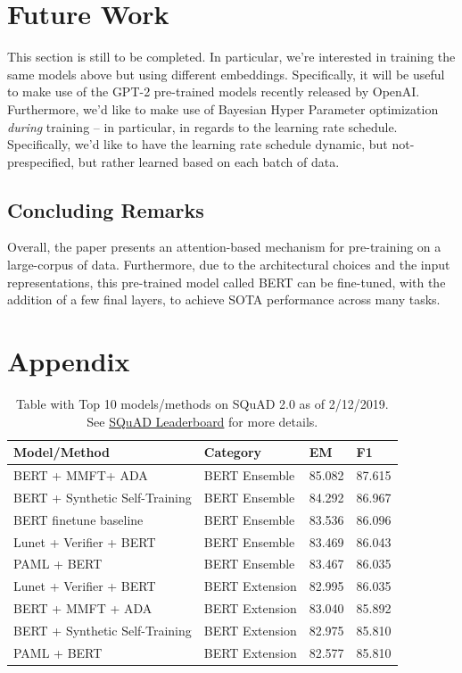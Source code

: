 \documentclass{article}
\begin{document}
\section{Future Work}
This section is still to be completed. In particular, we're interested in training the same models above but using different embeddings. Specifically, it will be useful to make use of the GPT-2 pre-trained models recently released by OpenAI. Furthermore, we'd like to make use of Bayesian Hyper Parameter optimization \textit{during} training -- in particular, in regards to the learning rate schedule. Specifically, we'd like to have the learning rate schedule dynamic, but not-prespecified, but rather learned based on each batch of data.

\subsection{Concluding Remarks}
Overall, the paper presents an attention-based mechanism for pre-training on a large-corpus of data. Furthermore, due to the architectural choices and the input representations, this pre-trained model called BERT can be fine-tuned, with the addition of a few final layers, to achieve SOTA performance across many tasks. 


\section{Appendix}

\begin{table}[!ht]
\centering
\begin{tabular}{l|l|l|l}
Model/Method                   & Category       & EM     & F1     \\ \hline
BERT + MMFT+ ADA               & BERT Ensemble  & 85.082 & 87.615 \\
BERT + Synthetic Self-Training & BERT Ensemble  & 84.292 & 86.967 \\
BERT finetune baseline         & BERT Ensemble  & 83.536 & 86.096 \\
Lunet + Verifier + BERT        & BERT Ensemble  & 83.469 & 86.043 \\
PAML + BERT                    & BERT Ensemble  & 83.467 & 86.035 \\
Lunet + Verifier + BERT        & BERT Extension & 82.995 & 86.035 \\
BERT + MMFT + ADA              & BERT Extension & 83.040 & 85.892 \\
BERT + Synthetic Self-Training & BERT Extension & 82.975 & 85.810 \\
PAML + BERT                    & BERT Extension & 82.577 & 85.810
\end{tabular}
\caption{Table with Top 10 models/methods on SQuAD 2.0 as of 2/12/2019. See \href{https://rajpurkar.github.io/SQuAD-explorer/}{SQuAD Leaderboard} for more details.}
\label{table:top_10_squad}
\end{table}
\end{document}
